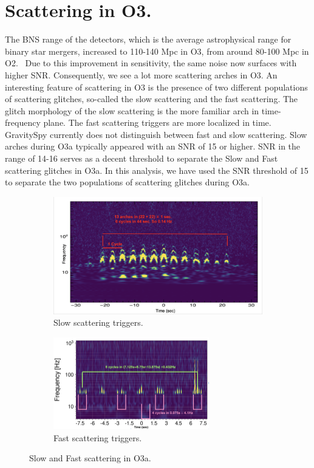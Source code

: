 \documentclass[12pt]{iopart}
\begin{document}
\section{Scattering in O3.}\label{scatino3}
The BNS range of the detectors, which is the average astrophysical range for binary star mergers, increased to 110-140 Mpc in O3, from around 80-100 Mpc in O2.~\cite{prospect} Due to this improvement in sensitivity, the same noise now surfaces with higher SNR.
Consequently, we see a lot more scattering arches in O3. An interesting feature of scattering in O3 is the presence of two different populations of scattering glitches, so-called the slow scattering and the fast scattering. The glitch morphology of the slow scattering is the more familiar arch in time-frequency plane. The fast scattering triggers are more localized in time. GravitySpy currently does not distinguish between fast and slow scattering. Slow arches during O3a  typically appeared with an SNR of 15 or higher. SNR in the range of 14-16 serves as a decent threshold to separate the Slow and Fast scattering glitches in O3a. In this analysis, we have used the SNR threshold of 15 to separate the two populations of scattering glitches during O3a.

\begin{figure}[h]
   \centering
    \begin{subfigure}[b]{0.45\textwidth}
        \centering
         \includegraphics[width= \textwidth]{slowarch.png}
         \caption{Slow scattering triggers.}
         \label{fig:slowscat}
    \end{subfigure}
    \hfill
    \begin{subfigure}[b]{0.5\textwidth}
        \centering
         \includegraphics[width =\textwidth,height=4cm]{fastscat6.png}
         \caption{Fast scattering triggers.}
         \label{fig:fastscat}
         
    
    \end{subfigure}
    \caption{Slow and Fast scattering in O3a.}
    \label{fig:fastslowscat}
    
\end{figure}
\end{document}

